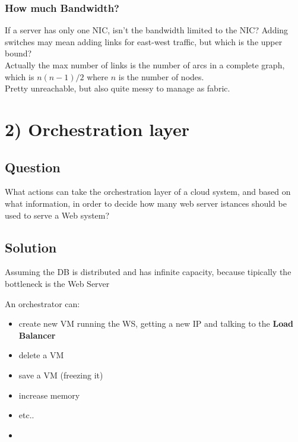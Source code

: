\subsubsection{How much Bandwidth?}
If a server has only one NIC, isn't the bandwidth limited to the NIC?
Adding switches may mean adding links for east-west traffic, but which is the upper bound?\\
Actually the max number of links is the number of arcs in a complete graph, which is $n(n-1)/2$ where $n$ is the number of nodes.\\
Pretty unreachable, but also quite messy to manage as fabric.

\hypertarget{orchestration-layer-1}{%
\section{2) Orchestration layer}\label{orchestration-layer-1}}

\hypertarget{question-1}{%
\subsection{Question}\label{question-1}}

What actions can take the orchestration layer of a cloud system, and
based on what information, in order to decide how many web server
istances should be used to serve a Web system?


\hypertarget{solution-1}{%
\subsection{Solution}\label{solution-1}}

Assuming the DB is distributed and has infinite capacity, because
tipically the bottleneck is the Web Server

An orchestrator can:

\begin{itemize}
\item
  create new VM running the WS, getting a new IP and talking to the
  \textbf{Load Balancer}
\item
  delete a VM
\item
  save a VM (freezing it)
\item
  increase memory
\item
  etc..
\item {}
\end{itemize}

